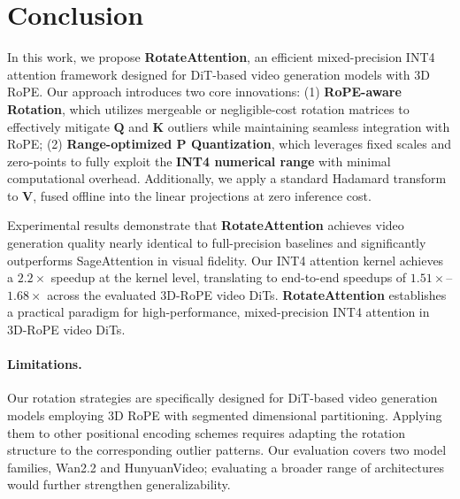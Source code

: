 
\section{Conclusion}

In this work, we propose \textbf{RotateAttention}, an efficient mixed-precision INT4 attention framework designed for DiT-based video generation models with 3D RoPE.
Our approach introduces two core innovations: 
(1) \textbf{RoPE-aware Rotation}, which utilizes mergeable or negligible-cost rotation matrices to effectively mitigate $\mathbf{Q}$ and $\mathbf{K}$ outliers while maintaining seamless integration with RoPE; 
(2) \textbf{Range-optimized $\mathbf{P}$ Quantization}, which leverages fixed scales and zero-points to fully exploit the \textbf{INT4 numerical range} with minimal computational overhead. Additionally, we apply a standard Hadamard transform to $\mathbf{V}$, fused offline into the linear projections at zero inference cost.

Experimental results demonstrate that \textbf{RotateAttention} achieves video generation quality nearly identical to full-precision baselines and significantly outperforms SageAttention in visual fidelity. Our INT4 attention kernel achieves a $2.2\times$ speedup at the kernel level, translating to end-to-end speedups of $1.51\times$--$1.68\times$ across the evaluated 3D-RoPE video DiTs. \textbf{RotateAttention} establishes a practical paradigm for high-performance, mixed-precision INT4 attention in 3D-RoPE video DiTs.


\paragraph{\textbf{Limitations.}} Our rotation strategies are specifically designed for DiT-based video generation models employing 3D RoPE with segmented dimensional partitioning. Applying them to other positional encoding schemes requires adapting the rotation structure to the corresponding outlier patterns. Our evaluation covers two model families, Wan2.2 and HunyuanVideo; evaluating a broader range of architectures would further strengthen generalizability.

